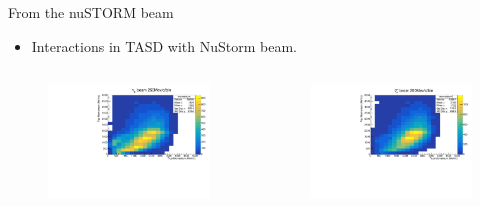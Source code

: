 \documentclass[11pt]{beamer}
\begin{document}
\begin{frame}{From the nuSTORM beam}
\begin{block}{}
	\begin{tiny}
		\begin{itemize}
			\item Interactions in TASD with NuStorm beam.
		\end{itemize}
	\end{tiny}
\end{block}
\begin{columns}[T] %
	\begin{column}{.48\textwidth}
		
		\begin{figure}[h!]
			\centering
			\includegraphics[width=\textwidth]{NuStorm/MomentumTASDNeutrinoBeamMIND.pdf}
		\end{figure}
	\end{column}%
	\begin{column}{.48\textwidth}
		\begin{figure}[h!]
			\centering
			\includegraphics[width=\textwidth]{NuStorm/MomentumTASDAntiNeutrinoBeamMIND.pdf}
		\end{figure}
	\end{column}%
\end{columns}
\end{frame}
\end{document}
